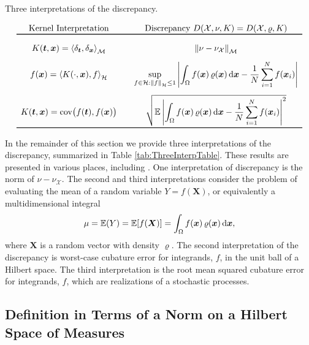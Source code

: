 \documentclass[graybox]{svmult}
\newcommand{\vx}{\boldsymbol{x}}
\newcommand{\vX}{\boldsymbol{X}}
\newcommand{\vt}{\boldsymbol{t}}
\newcommand{\dif}{{\rm d}}
\newcommand{\Xdes}{\mathcal{X}}
\newcommand{\cm}{\mathcal{M}}
\newcommand{\ch}{\mathcal{H}}
\newcommand{\Ex}{\mathbb{E}}
\newcommand{\ip}[3][{}]{\ensuremath{\left \langle #2, #3 \right \rangle_{#1}}}
\newcommand{\norm}[2][{}]{\ensuremath{\left \lVert #2 \right \rVert}_{#1}}
\DeclareMathOperator{\cov}{cov}
\def\abs#1{\ensuremath{\left \lvert #1 \right \rvert}}
\begin{document}
\begin{table}
\centering
\caption{Three interpretations of the discrepancy.}
\vspace{-3ex}
\begin{equation*}
\begin{array}{c@{\qquad}ccc}
\text{Kernel Interpretation} & \text{Discrepancy } D(\Xdes,\nu,K) = D(\Xdes,\varrho,K)\\
\toprule \\[-1ex]
K(\vt,\vx) = \ip[\cm]{\delta_{\vt}}{\delta_{\vx}} & \norm[\cm]{\nu - \nu_{\Xdes}} \\[2ex]
f(\vx) = \ip[\ch]{K(\cdot,\vx)}{f} & \displaystyle \sup_{f \in \ch : \norm[\ch]{f} \le 1} \abs{\int_{\Omega} f(\vx) \, \varrho(\vx) \, \dif \vx - \frac 1N \sum_{i=1}^N f(\vx_i)}\\[4ex]
K(\vt,\vx) = \cov\bigl(f(\vt), f(\vx) \bigr) & \displaystyle \sqrt{\Ex \abs{\int_{\Omega} f(\vx) \, \varrho(\vx) \, \dif \vx - \frac 1N \sum_{i=1}^N f(\vx_i)}^2}\\\bottomrule
\end{array}
\end{equation*}
\label{tab:ThreeInterpTable}
\end{table}

In the remainder of this section we provide three interpretations of the discrepancy, summarized in Table \ref{tab:ThreeInterpTable}.  These results are presented in various places, including \cites{Hic99a,Hic17a}.  One interpretation of discrepancy is the norm of $\nu - \nu_{\Xdes}$.  The second and third interpretations consider the problem of evaluating the mean of a random variable $Y=f(\vX)$, or equivalently a multidimensional integral
\begin{equation}\label{eq:integration}
\mu = \Ex(Y) = \Ex[f(\vX)] = \int_{\Omega} f(\vx) \, \varrho(\vx) \, \dif \vx,
\end{equation}
where $\vX$ is a random vector with density $\varrho$. The second
interpretation of the discrepancy is worst-case cubature error for integrands, $f$, in the unit ball of a Hilbert space.  The third interpretation is the root mean squared cubature error for integrands, $f$, which are realizations of a stochastic processes.


\subsection{Definition in Terms of a Norm on a Hilbert Space of Measures}
\label{sec:HilbertMeasures}
\end{document}
